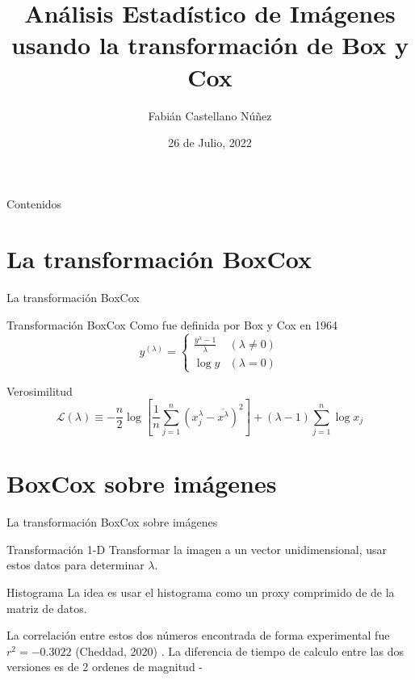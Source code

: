 \documentclass{beamer}
\title[Proyecto de Memoria - MAT301]{Análisis Estadístico de Imágenes usando la transformación de Box y Cox}
\author{Fabián Castellano Núñez}
\institute[Universidad Técnica Federico Santa María]
  {
  Profesor Guia: Ronny Vallejos
  }
\date{26 de Julio,  2022}
\begin{document}
\begin{frame}
  \titlepage
\end{frame}

\begin{frame}{Contenidos}
  \tableofcontents
\end{frame}




\section{La transformación BoxCox}

\begin{frame}{La transformación BoxCox}
    \pause
    \begin{block}{Transformación BoxCox}
    Como fue definida por Box y Cox en 1964 \cite{boxcox}
        \begin{equation}\label{boxcox}
            y^{(\lambda)}= \begin{cases}\frac{y^{\lambda}-1}{\lambda} & (\lambda \neq 0) \\ \log y & (\lambda=0)\end{cases}
        \end{equation}
    \end{block}
        \pause
    \begin{block}{Verosimilitud}
        \begin{equation*}
            \mathcal{L}(\lambda) \equiv-\frac{n}{2} \log \left[\frac{1}{n} \sum_{j=1}^{n}\left(x_{j}^{\lambda}-\overline{x^{\lambda}}\right)^{2}\right] +(\lambda-1) \sum_{j=1}^{n} \log x_{j}
        \end{equation*}
    \end{block}
    
\end{frame}
\section{BoxCox sobre imágenes}
\begin{frame}{La transformación BoxCox sobre imágenes}
    \pause
    \begin{block}{Transformación 1-D}
        Transformar la imagen a un vector unidimensional, usar estos datos para determinar $\lambda$.
    \end{block}
    
        \pause
        
    \begin{block}{Histograma}
        La idea es usar el histograma como un proxy comprimido de de la matriz de datos. 
    \end{block}
        \pause
    
    La correlación entre estos dos números encontrada de forma experimental fue $r^2=-0.3022$ (Cheddad, 2020) \cite{cheddad2020}. La diferencia de tiempo de calculo entre las dos versiones es de 2 ordenes de magnitud
    -
\end{frame}
\end{document}
